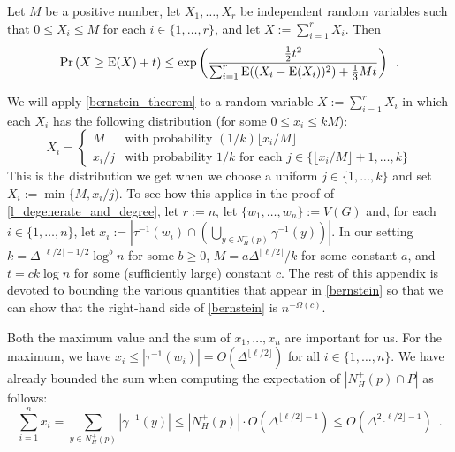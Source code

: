 \documentclass{patmorin}
\begin{document}
\begin{thm}\label{bernstein_theorem}
  Let $M$ be a positive number, let $X_1,\ldots,X_r$ be independent random variables such that $0\le X_i\le M$ for each $i\in\{1,\ldots,r\}$, and let $X:=\sum_{i=1}^r X_i$. Then
  \begin{equation}
    \Pr\left(X \ge \mathrm{E}(X)+ t\right)
      \le \exp\left(\frac{\tfrac{1}{2}t^2}{\sum_{i=1}^r \mathrm{E}((X_i-\mathrm{E}(X_i))^2)+\tfrac{1}{3}Mt}\right) \enspace . \label{bernstein}
  \end{equation}
\end{thm}
We will apply \cref{bernstein_theorem} to a random variable $X:=\sum_{i=1}^r X_i$ in which each $X_i$ has the following distribution (for some $0\le x_i\le kM$):
\[
  X_i = \begin{cases}
          M & \text{with probability $(1/k)\lfloor x_i/M\rfloor$} \\
          x_i/j & \text{with probability $1/k$ for each $j\in\{\lfloor x_i/M\rfloor+1,\ldots,k\}$}
        \end{cases}
\]
This is the distribution we get when we choose a uniform $j\in\{1,\ldots,k\}$ and set $X_i:=\min\{M,x_i/j)$.  To see how this applies in the proof of \cref{l_degenerate_and_degree}, let $r:=n$, let $\{w_1,\ldots,w_n\}:=V(G)$ and, for each $i\in\{1,\ldots,n\}$, let $x_i:=|\tau^{-1}(w_i)\cap\left(\bigcup_{y\in N^+_H(p)}\gamma^{-1}(y)\right)|$.  In our setting $k=\Delta^{\lfloor\ell/2\rfloor-1/2}\log^b n$ for some $b\ge 0$,  $M=a\Delta^{\lfloor\ell/2\rfloor}/k$ for some constant $a$, and $t=ck\log n$ for some (sufficiently large) constant $c$.  The rest of this appendix is devoted to bounding the various quantities that appear in \cref{bernstein} so that we can show that the right-hand side of \cref{bernstein} is $n^{-\Omega(c)}$.

Both the maximum value and the sum of $x_1,\ldots,x_n$ are important for us. For the maximum, we have $x_i\le|\tau^{-1}(w_i)|= O(\Delta^{\lfloor\ell/2\rfloor})$ for all $i\in\{1,\ldots,n\}$.  We have already bounded the sum when computing the expectation of $|N_H^+(p)\cap P|$ as follows:
\[
  \sum_{i=1}^n x_i = \sum_{y\in N^+_H(p)} |\gamma^{-1}(y)|
  \le |N^+_H(p)|\cdot O(\Delta^{\lfloor\ell/2\rfloor-1})
  \le O(\Delta^{2\lfloor\ell/2\rfloor-1}) \enspace .
\]
\end{document}
